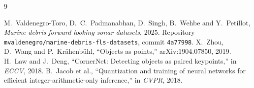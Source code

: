\documentclass[11pt,a4paper]{article}
\begin{document}
\begin{thebibliography}{9}\raggedright
{} M.~Valdenegro-Toro, D.~C.~Padmanabhan, D.~Singh, B.~Wehbe and Y.~Petillot,
  \emph{Marine debris forward-looking sonar datasets}, 2025. Repository
  \texttt{mvaldenegro/marine-debris-fls-datasets}, commit \texttt{4a77998}.
 X.~Zhou, D.~Wang and P.~Kr\"ahenb\"uhl, ``Objects as points,'' arXiv:1904.07850, 2019.
 H.~Law and J.~Deng, ``CornerNet: Detecting objects as paired keypoints,'' in \emph{ECCV}, 2018.
 B.~Jacob et al., ``Quantization and training of neural networks for efficient integer-arithmetic-only inference,'' in \emph{CVPR}, 2018.
\end{thebibliography}
\end{document}
